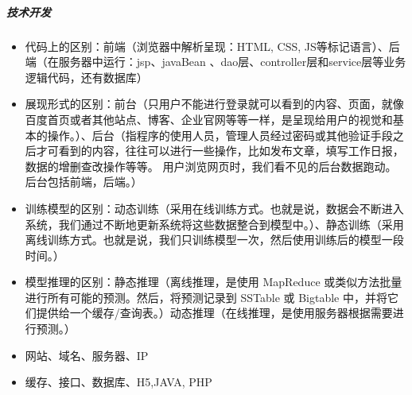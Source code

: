 \documentclass[letterpaper,10pt,english]{sphinxmanual}
\begin{document}
\subparagraph{技术开发}
\label{\detokenize{chapter_introduction/PM:id49}}\begin{itemize}
\item {} 
代码上的区别：前端（浏览器中解析呈现：HTML, CSS,
JS等标记语言）、后端（在服务器中运行：jsp、javaBean
、dao层、controller层和service层等业务逻辑代码，还有数据库）

\item {} 
展现形式的区别：前台（只用户不能进行登录就可以看到的内容、页面，就像百度首页或者其他站点、博客、企业官网等等一样，是呈现给用户的视觉和基本的操作。）、后台（指程序的使用人员，管理人员经过密码或其他验证手段之后才可看到的内容，往往可以进行一些操作，比如发布文章，填写工作日报，数据的增删查改操作等等。
用户浏览网页时，我们看不见的后台数据跑动。后台包括前端，后端。）

\item {} 
训练模型的区别：动态训练（采用在线训练方式。也就是说，数据会不断进入系统，我们通过不断地更新系统将这些数据整合到模型中。）、静态训练（采用离线训练方式。也就是说，我们只训练模型一次，然后使用训练后的模型一段时间。）

\item {} 
模型推理的区别：静态推理（离线推理，是使用 MapReduce
或类似方法批量进行所有可能的预测。然后，将预测记录到 SSTable 或
Bigtable
中，并将它们提供给一个缓存/查询表。）动态推理（在线推理，是使用服务器根据需要进行预测。）%
\begin{footnote}[198]\sphinxAtStartFootnote
{}
%
\end{footnote}

\item {} 
网站、域名、服务器、IP

\item {} 
缓存、接口、数据库、H5,JAVA, PHP

\end{itemize}
\end{document}
